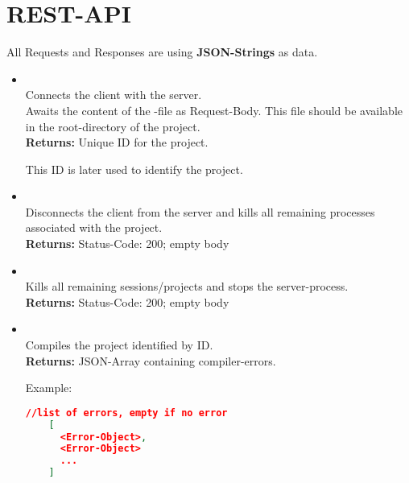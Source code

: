 \section{REST-API}

\newcommand{\returnline}[1]{\textbf{Returns:} #1}
\newcommand{\return}[2]{\textbf{Returns:} #1
  \begin{addmargin}{0.05\textwidth}
  #2
  \end{addmargin}
}
\newcommand{\param}[2]{\textbf{Request-Body:} #1
  \begin{addmargin}{0.05\textwidth}
  #2
  \end{addmargin}
}

All Requests and Responses are using \textbf{JSON-Strings} as data.

\begin{itemize}
  \item {} \\
  Connects the client with the server. \\
  Awaits the content of the  -file as Request-Body. This file should be
  available in the root-directory of the project. \\
  \return{Unique ID for the project.}{This ID is later used to identify the project.}

  \item {} \\
  Disconnects the client from the server and kills all remaining processes associated
  with the project. \\
  \returnline{Status-Code: 200; empty body}

  \item {} \\
  Kills all remaining sessions/projects and stops the server-process. \\
  \returnline{Status-Code: 200; empty body}

  \item {} \\
  Compiles the project identified by ID. \\
  \return{JSON-Array containing compiler-errors.}{Example:}
  \begin{lstlisting}[basicstyle=\small,language=json]
    //list of errors, empty if no error
    [
      <Error-Object>,
      <Error-Object>
      ...
    ]
  \end{lstlisting}


\end{itemize}
